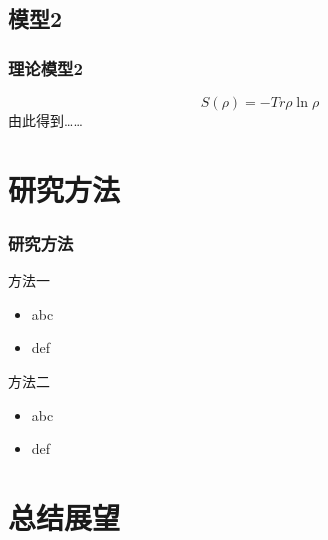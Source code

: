 \documentclass{ctexbeamer}
\begin{document}
\subsection{模型2}
\begin{frame}
  \frametitle{理论模型2}
  \begin{equation*}
    S\left(\rho\right)=-Tr\rho\ln\rho
  \end{equation*}
  \pause
  由此得到……

\end{frame}


\section{研究方法}

\begin{frame}
  \frametitle{研究方法}
  \begin{block}{方法一}
    \begin{itemize}
      \item abc
      \item def
    \end{itemize}
  \end{block}
  \pause
  \begin{block}{方法二}
    \begin{itemize}
      \item abc
      \item def
    \end{itemize}
  \end{block}
\end{frame}


\section{总结展望}
\end{document}
